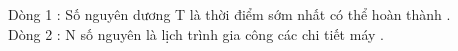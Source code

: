 Dòng 1 : Số nguyên dương T là thời điểm sớm nhất có thể hoàn thành .   
\\   Dòng 2 : N số nguyên là lịch trình gia công các chi tiết máy .